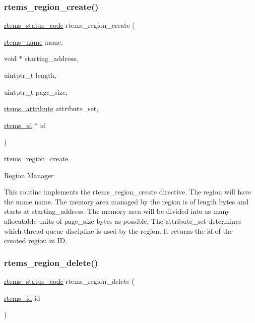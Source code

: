 \subsubsection{\texorpdfstring{rtems\_region\_create()}{rtems\_region\_create()}}
{\footnotesize\ttfamily \mbox{\hyperlink{group__ClassicStatus_ga545d41846817eaba6143d52ee4d9e9fe}{rtems\+\_\+status\+\_\+code}} rtems\+\_\+region\+\_\+create (\begin{DoxyParamCaption}\item[{\mbox{\hyperlink{group__ClassicTasks_ga55fb63c49f68c0cbd9bee004da15b1fd}{rtems\+\_\+name}}}]{name,  }\item[{void $\ast$}]{starting\+\_\+address,  }\item[{uintptr\+\_\+t}]{length,  }\item[{uintptr\+\_\+t}]{page\+\_\+size,  }\item[{\mbox{\hyperlink{group__ClassicAttributes_gaea40313cf78ed843e09c4315d0a10f79}{rtems\+\_\+attribute}}}]{attribute\+\_\+set,  }\item[{\mbox{\hyperlink{group__ClassicTasks_gab20892b814dced7dd4e5b9bf42becd57}{rtems\+\_\+id}} $\ast$}]{id }\end{DoxyParamCaption})}



rtems\+\_\+region\+\_\+create 

Region Manager

This routine implements the rtems\+\_\+region\+\_\+create directive. The region will have the name name. The memory area managed by the region is of length bytes and starts at starting\+\_\+address. The memory area will be divided into as many allocatable units of page\+\_\+size bytes as possible. The attribute\+\_\+set determines which thread queue discipline is used by the region. It returns the id of the created region in ID. \mbox{\label{group__ClassicRegion_ga3fe54d7a4ca52287e94975d76540a893}} 
\subsubsection{\texorpdfstring{rtems\_region\_delete()}{rtems\_region\_delete()}}
{\footnotesize\ttfamily \mbox{\hyperlink{group__ClassicStatus_ga545d41846817eaba6143d52ee4d9e9fe}{rtems\+\_\+status\+\_\+code}} rtems\+\_\+region\+\_\+delete (\begin{DoxyParamCaption}\item[{\mbox{\hyperlink{group__ClassicTasks_gab20892b814dced7dd4e5b9bf42becd57}{rtems\+\_\+id}}}]{id }\end{DoxyParamCaption})}



